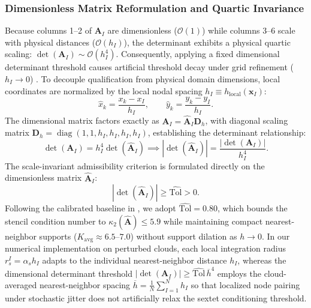 \documentclass[preprint,12pt]{elsarticle}
\begin{document}
\subsubsection{Dimensionless Matrix Reformulation and Quartic Invariance}
Because columns 1--2 of $\mathbf{A}_I$ are dimensionless ($\mathcal{O}(1)$) while columns 3--6 scale with physical distances ($\mathcal{O}(h_I)$), the determinant exhibits a physical quartic scaling: $\det(\mathbf{A}_I) \sim \mathcal{O}(h_I^4)$. Consequently, applying a fixed dimensional determinant threshold causes artificial threshold decay under grid refinement ($h_I \to 0$) \cite{stable_vnmm2d_2026}.
To decouple qualification from physical domain dimensions, local coordinates are normalized by the local nodal spacing $h_I \equiv h_{\mathrm{local}}(\mathbf{x}_I)$:
\begin{equation}
    \hat{x}_k = \frac{x_k - x_I}{h_I}, \qquad \hat{y}_k = \frac{y_k - y_I}{h_I}.
\end{equation}
The dimensional matrix factors exactly as $\mathbf{A}_I = \widehat{\mathbf{A}}_I \mathbf{D}_h$, with diagonal scaling matrix $\mathbf{D}_h = \operatorname{diag}(1, 1, h_I, h_I, h_I, h_I)$, establishing the determinant relationship:
\begin{equation}
    \det(\mathbf{A}_I) = h_I^4 \det(\widehat{\mathbf{A}}_I) \implies |\det(\widehat{\mathbf{A}}_I)| = \frac{|\det(\mathbf{A}_I)|}{h_I^4}.
    \label{eq:dimensionless_det_relation}
\end{equation}
The scale-invariant admissibility criterion is formulated directly on the dimensionless matrix $\widehat{\mathbf{A}}_I$:
\begin{equation}
    |\det(\widehat{\mathbf{A}}_I)| \ge \widehat{\mathrm{Tol}} > 0.
    \label{eq:scale_invariant_det_criterion}
\end{equation}
Following the calibrated baseline in \cite{stable_vnmm2d_2026}, we adopt $\widehat{\mathrm{Tol}} = 0.80$, which bounds the stencil condition number to $\kappa_2(\widehat{\mathbf{A}}) \le 5.9$ while maintaining compact nearest-neighbor supports ($K_{\mathrm{avg}} \approx 6.5\text{--}7.0$) without support dilation as $h \to 0$. In our numerical implementation on perturbed clouds, each local integration radius $r_s^I = \alpha_s h_I$ adapts to the individual nearest-neighbor distance $h_I$, whereas the dimensional determinant threshold $|\det(\mathbf{A}_I)| \ge \widehat{\mathrm{Tol}} \, \overline{h}^4$ employs the cloud-averaged nearest-neighbor spacing $\overline{h} = \frac{1}{N}\sum_{I=1}^N h_I$ so that localized node pairing under stochastic jitter does not artificially relax the sextet conditioning threshold.
\end{document}
